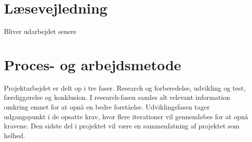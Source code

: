 \section{Læsevejledning}
Bliver udarbejdet senere

\section{Proces- og arbejdsmetode}
Projektarbejdet er delt op i tre faser. Research og forberedelse, udvikling og test, færdiggørelse og konklusion. I research-fasen samles alt relevant information omkring emnet for at opnå en bedre forståelse. Udviklingsfasen tager udgangspunkt i de opsatte krav, hvor flere iterationer vil gennemløbes for at opnå kravene. Den sidste del i projektet vil være en sammenfatning af projektet som helhed.




